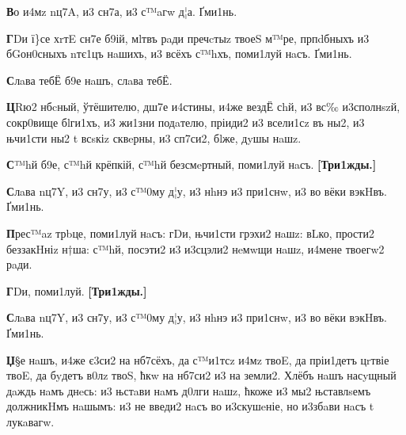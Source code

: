 
\textbf{В}о и4мz nц7A, и3 сн7а, и3 с™aгw д¦а. Ґми1нь.

\textbf{Г}Dи ї\}се хrтE сн7е б9ій, мlтвъ рaди пречcтыz твоеS м™ре, прпdбныхъ и3
бGон0сныхъ nтє1цъ нaшихъ, и3 всёхъ с™hхъ, поми1луй нaсъ. Ґми1нь.

\textbf{С}лaва тебЁ б9е нaшъ, слaва тебЁ.

\textbf{Ц}Rю2 нбcный, ўтёшителю, дш7е и4стины, и4же вездЁ сhй, и3 вс‰ и3сполнszй,
сокр0вище бlги1хъ, и3 жи1зни подaтелю, пріиди2 и3 всели1сz въ ны2, и3
њчи1сти ны2 t всsкіz сквeрны, и3 сп7си2, бlже, дyшы нaшz.

\textbf{С}™hй б9е, с™hй крёпкій, с™hй безсмeртный, поми1луй нaсъ.
\textbf{{[}Три1жды.{]}}

\textbf{С}лaва nц7Y, и3 сн7у, и3 с™0му д¦у, и3 нhнэ и3 при1снw, и3 во вёки
вэкHвъ. Ґми1нь.

\textbf{П}рес™az трbце, поми1луй нaсъ: гDи, њчи1сти грэхи2 нaшz: вLко, прости2
беззакHніz н†ша: с™hй, посэти2 и3 и3сцэли2 нeмwщи нaшz, и4мене твоегw2
рaди.


\textbf{Г}Dи, поми1луй. \textbf{{[}Три1жды.{]}}

\textbf{С}лaва nц7Y, и3 сн7у, и3 с™0му д¦у, и3 нhнэ и3 при1снw, и3 во вёки
вэкHвъ. Ґми1нь.

\textbf{Џ}§е нaшъ, и4же є3си2 на нб7сёхъ, да с™и1тсz и4мz твоE, да пріи1детъ
цrтвіе твоE, да бyдетъ в0лz твоS, ћкw на нб7си2 и3 на земли2. Хлёбъ нaшъ
насyщный дaждь нaмъ днeсь: и3 њстaви нaмъ д0лги нaшz, ћкоже и3 мы2
њставлsемъ должникHмъ нaшымъ: и3 не введи2 нaсъ во и3скушeніе, но
и3збaви нaсъ t лукaвагw.


